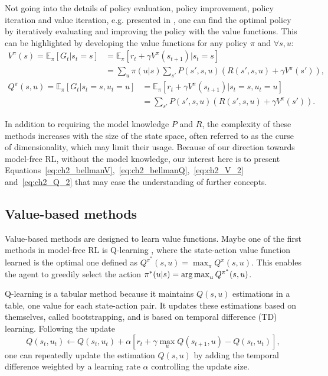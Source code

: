 Not going into the details of policy evaluation, policy improvement, policy iteration and value iteration, e.g. presented in \citep{sutton2018reinforcement}, one can find the optimal policy by iteratively evaluating and improving the policy with the value functions.
This can be highlighted by developing the value functions for any policy $\pi$ and $\forall s, u$:
\begin{equation}
\label{eq:ch2_V_2}
\begin{split}
    V^\pi(s)= \mathbb{E}_{\pi}\left[G_t|s_t=s\right] & = \mathbb{E}_{\pi}\left[r_t + \gamma V^\pi(s_{t+1})|s_t=s\right]\\
     & = \sum_{u} \pi(u|s) \sum_{s'} P(s', s, u) (R(s', s, u) + \gamma V^\pi(s')),
\end{split}
\end{equation}
\begin{equation}
\label{eq:ch2_Q_2}
\begin{split}
    Q^\pi(s, u) = \mathbb{E}_{\pi}\left[G_t|s_t=s, u_t=u\right] & = \mathbb{E}_{\pi}\left[r_t + \gamma V^\pi(s_{t+1})|s_t=s, u_t=u \right] \\
    &  = \sum_{s'} P(s', s, u) (R(s', s, u) + \gamma V^\pi(s')).
\end{split}
\end{equation}

In addition to requiring the model knowledge $P$ and $R$, the complexity of these methods increases with the size of the state space, often referred to as the curse of dimensionality, which may limit their usage.
Because of our direction towards model-free RL, without the model knowledge, our interest here is to present Equations~\ref{eq:ch2_bellmanV},~\ref{eq:ch2_bellmanQ},~\ref{eq:ch2_V_2} and~\ref{eq:ch2_Q_2} that may ease the understanding of further concepts.


\subsection{Value-based methods} \label{sec:ch2_value_based_methods}
Value-based methods are designed to learn value functions.
Maybe one of the first methods in model-free RL is Q-learning \citep{watkins1992q}, where the state-action value function learned is the optimal one defined as $Q^{\pi^*}(s, u)=\max_{\pi}Q^\pi(s, u)$.
This enables the agent to greedily select the action $\pi^*(u|s)=\operatorname*{arg\,max}_u Q^{\pi^*}(s, u)$.

Q-learning is a tabular method because it maintains $Q(s, u)$ estimations in a table, one value for each state-action pair.
It updates these estimations based on themselves, called bootstrapping, and is based on temporal difference (TD) learning.
Following the update 
\begin{equation}
\label{eq:ch2_QLearning}
    Q(s_t, u_t) \leftarrow Q(s_t, u_t) + \alpha \left[ r_t + \gamma \max_u Q(s_{t+1}, u) - Q(s_t, u_t) \right],
\end{equation}
one can repeatedly update the estimation $Q(s, u)$ by adding the temporal difference weighted by a learning rate $\alpha$ controlling the update size.

